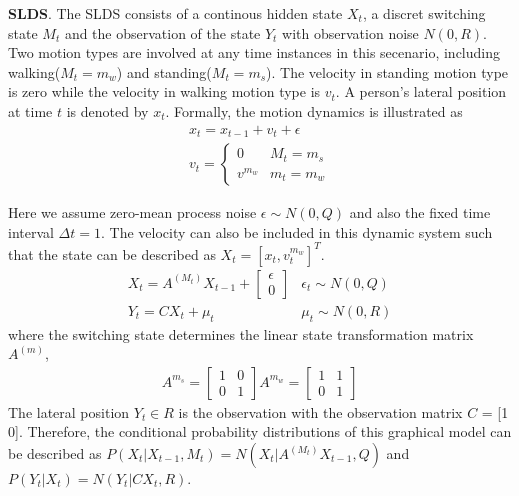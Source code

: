 \documentclass[10pt,twocolumn,letterpaper]{article}
\begin{document}
    \noindent
    \textbf{SLDS}. The SLDS consists of a continous hidden state $X_t$, a discret
    switching state $M_t$ and the observation of the state $Y_t$ with observation 
    noise $N(0,R)$.  Two motion types are involved at any time instances in this secenario, including 
    walking($M_t=m_w$) and standing($M_t = m_s$). The velocity in standing motion type is
    zero while the velocity in walking motion type is $v_t$. A person's lateral position
    at time $t$ is denoted by $x_t$. Formally, the motion dynamics is illustrated as
    \begin{eqnarray*}
        x_t = x_{t-1} + v_t + \epsilon\\
        v_t = \left\{
            \begin{array}{lr}          0 & M_t = m_s \\
                                    v^{m_w} & m_t = m_w
            \end{array}
        \right.
    \end{eqnarray*}

    Here we assume zero-mean process noise $\epsilon \sim N(0, Q)$ and also the fixed 
    time interval $\Delta t= 1$. The velocity can also be included in this dynamic 
    system such that the state can be described as $X_t = [x_t, v_t^{m_w}]^T$.
    \begin{eqnarray*}
        X_t = A^{(M_t)}X_{t-1} +  \left[\begin{matrix}
            \epsilon  \\
            0 
           \end{matrix}\right] & \epsilon_t \sim N(0, Q)\\
        Y_t = CX_t + \mu_t & \mu_t \sim N(0, R)
    \end{eqnarray*}
    where the switching state determines the linear state transformation matrix $A^{(m)}$,
    \begin{eqnarray*}
        A^{m_s} = \left[ \begin{matrix}
            1&0\\
            0&1
        \end{matrix}
            \right]  
        A^{m_w} = \left[ \begin{matrix}
            1&1\\
            0&1
        \end{matrix}
            \right]  
    \end{eqnarray*}
    The lateral position $Y_t \in R$ is the observation with the observation matrix
    $C$ = [1 0]. Therefore, the conditional probability distributions of this graphical 
    model can be described as $P(X_t|X_{t-1}, M_t) = N(X_t|A^{(M_t)}X_{t-1},Q)$ and
    $P(Y_t|X_t) = N(Y_t|CX_t,R)$.\\
\end{document}
